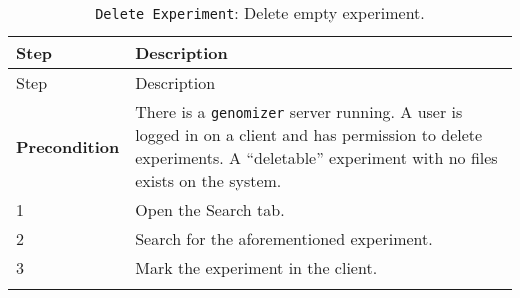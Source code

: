 \begin{longtable}[c]{@{}ll@{}}
\caption{\texttt{Delete\ Experiment}: Delete empty
experiment.}\tabularnewline
\toprule
\begin{minipage}[b]{0.31\columnwidth}\raggedright\strut
Step
\strut\end{minipage} &
\begin{minipage}[b]{0.63\columnwidth}\raggedright\strut
Description
\strut\end{minipage}\tabularnewline
\midrule
\endfirsthead
\toprule
\begin{minipage}[b]{0.31\columnwidth}\raggedright\strut
Step
\strut\end{minipage} &
\begin{minipage}[b]{0.63\columnwidth}\raggedright\strut
Description
\strut\end{minipage}\tabularnewline
\midrule
\endhead
\begin{minipage}[t]{0.31\columnwidth}\raggedright\strut
\textbf{Precondition}
\strut\end{minipage} &
\begin{minipage}[t]{0.63\columnwidth}\raggedright\strut
There is a \texttt{genomizer} server running. A user is logged in on a
client and has permission to delete experiments. A ``deletable''
experiment with no files exists on the system.
\strut\end{minipage}\tabularnewline
\begin{minipage}[t]{0.31\columnwidth}\raggedright\strut
1
\strut\end{minipage} &
\begin{minipage}[t]{0.63\columnwidth}\raggedright\strut
Open the Search tab.
\strut\end{minipage}\tabularnewline
\begin{minipage}[t]{0.31\columnwidth}\raggedright\strut
2
\strut\end{minipage} &
\begin{minipage}[t]{0.63\columnwidth}\raggedright\strut
Search for the aforementioned experiment.
\strut\end{minipage}\tabularnewline
\begin{minipage}[t]{0.31\columnwidth}\raggedright\strut
3
\strut\end{minipage} &
\begin{minipage}[t]{0.63\columnwidth}\raggedright\strut
Mark the experiment in the client.
\strut\end{minipage}\tabularnewline
\begin{minipage}[t]{0.31\columnwidth}\raggedright\strut

\end{minipage}
\end{longtable}
